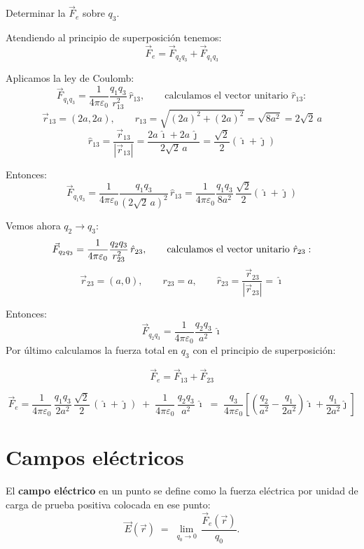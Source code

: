 \documentclass[a4paper,12pt]{article}
\begin{document}
Determinar la $\vec{F}_e$ sobre $q_3$.

Atendiendo al principio de superposición tenemos:
\[
\vec{F}_e = \vec{F}_{q_2 q_3} + \vec{F}_{q_1 q_3}
\]

Aplicamos la ley de Coulomb:
\[
\vec{F}_{q_1 q_3} = \frac{1}{4\pi \varepsilon_0} \frac{q_1 q_3}{r_{13}^2} \, \hat{r}_{13}, 
\qquad \text{calculamos el vector unitario } \hat{r}_{13} :
\]
\[
\vec{r}_{13} = (2a,2a), 
\qquad r_{13} = \sqrt{(2a)^2+(2a)^2} = \sqrt{8a^2} = 2\sqrt{2}\,a
\]
\[
\hat{r}_{13} = \frac{\vec{r}_{13}}{|\vec{r}_{13}|} = \frac{2a\,\hat{\imath} + 2a\,\hat{\jmath}}{2\sqrt{2}\,a} 
= \frac{\sqrt{2}}{2} (\hat{\imath} + \hat{\jmath})
\]

Entonces:
\[
\vec{F}_{q_1 q_3} = \frac{1}{4\pi \varepsilon_0} \frac{q_1 q_3}{(2\sqrt{2}\,a)^2} \, \hat{r}_{13}
= \frac{1}{4\pi \varepsilon_0} \frac{q_1 q_3}{8a^2} \, \frac{\sqrt{2}}{2} (\hat{\imath} + \hat{\jmath})
\]

Vemos ahora $q_2 \to q_3$:
\[
\vec{F}_{q_2 q_3} = \frac{1}{4\pi \varepsilon_0} \frac{q_2 q_3}{r_{23}^2} \, \hat{r}_{23}, \\
\qquad \text{calculamos el vector unitario } \hat{r}_{23} :
\]
\[
\vec{r}_{23} = (a,0), \qquad r_{23}=a, \qquad \hat{r}_{23} = \frac{\vec{r}_{23}}{|\vec{r}_{23}|} = \hat{\imath}
\]

Entonces:
\[
\vec{F}_{q_2 q_3} = \frac{1}{4\pi \varepsilon_0} \frac{q_2 q_3}{a^2} \, \hat{\imath}
\]
Por último calculamos la fuerza total en $q_3$ con el principio de superposición:

\[
\vec{F}_e = \vec{F}_{13} + \vec{F}_{23}
\]

\[
\vec{F}_e =
\frac{1}{4\pi\varepsilon_0}\,\frac{q_1 q_3}{2a^2}\,\frac{\sqrt{2}}{2}\,(\hat{\imath}+\hat{\jmath})
\;+\;
\frac{1}{4\pi\varepsilon_0}\,\frac{q_2 q_3}{a^2}\,\hat{\imath}
\;=\;
\frac{q_3}{4\pi\varepsilon_0}\!\left[
\left(\frac{q_2}{a^2}-\frac{q_1}{2a^2}\right)\hat{\imath}
+\frac{q_1}{2a^2}\hat{\jmath}
\right]
\]

\newpage

\section{Campos eléctricos}

El \textbf{campo eléctrico} en un punto se define como la fuerza eléctrica por unidad de carga de prueba positiva colocada en ese punto:
\[
\vec E(\vec r) \;=\; \lim_{q_0 \to 0}\,\frac{\vec F_e(\vec r)}{q_0}.
\]
\end{document}
